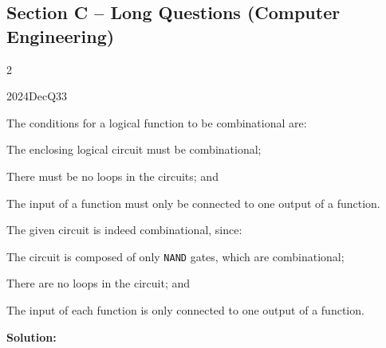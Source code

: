 \subsection*{Section C -- Long Questions (Computer Engineering)}
\begin{multicols}{2}

\begin{qsolution}{2024}{Dec}{Q33}{\tgCE \tgCELogicalCircuits}

    The conditions for a logical function to be combinational are:
    \begin{enumarab}
        \item The enclosing logical circuit must be combinational;
        \item There must be no loops in the circuits; and
        \item The input of a function must only be connected to one output of a function.
    \end{enumarab}

    The given circuit is indeed combinational, since:
    \begin{enumarab}
        \item The circuit is composed of only \texttt{NAND} gates, which are combinational;
        \item There are no loops in the circuit; and
        \item The input of each function is only connected to one output of a function.
    \end{enumarab}

\end{qsolution}

\columnbreak


\textbf{Solution:}
\begin{parts}
    \part 
\end{parts}
\dotfill

\end{multicols}

\pagebreak

